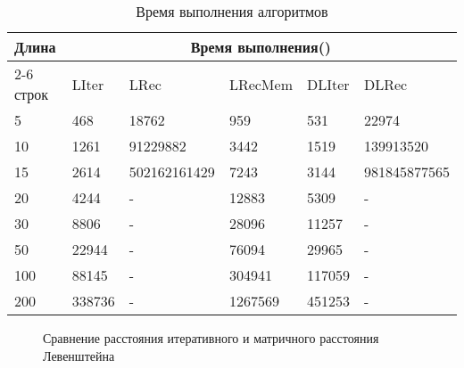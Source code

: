 \begin{table}[h!]
	\begin{center}
		\caption{Время выполнения алгоритмов}
		\begin{tabular}{ ||p{1.5cm}||p{2cm}|p{3cm}|p{2cm}|p{2cm}|p{3.5cm}||  }
			\hline
			\multirow{2}{*}{Длина}& \multicolumn{5}{c||}{Время выполнения()} \\[1.5ex]
			\cline{2-6} 
			строк&LIter & LRec & LRecMem & DLIter & DLRec \\ [1.5ex] 
			\hline\hline
			5 & 468 & 18762 & 959 & 531 &  22974\\ [0.7ex]
			10 & 1261& 91229882 & 3442 & 1519 & 139913520\\ [0.7ex]
			15 & 2614& 502162161429 & 7243 & 3144 & 981845877565 \\ [0.7ex]
			20 & 4244& - & 12883 & 5309 &  -\\ [0.7ex]
			30 & 8806& - & 28096 & 11257 & - \\ [0.7ex]
			50 & 22944& - & 76094 & 29965 & - \\ [0.7ex]
			100 & 88145& - & 304941 &117059 & - \\ [0.7ex]
			200 & 338736& - & 1267569 & 451253 & - \\ [0.7ex]
			\hline
		\end{tabular}
		\label{time-table}
	\end{center}
\end{table}

\begin{figure}[h!]
	\begin{center}
	\end{center}
\caption{Сравнение расстояния итеративного и матричного расстояния Левенштейна}
\end{figure}

